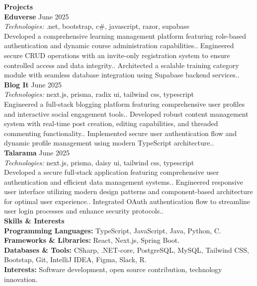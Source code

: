 \documentclass[11pt,letterpaper]{article}
\newcommand{\ressection}[1]{\vspace{0.3cm}\textbf{\large #1}\\[0.1cm]}
\begin{document}
\ressection{Projects}
\textbf{Eduverse} \hfill June 2025\\\textit{Technologies:} .net, bootstrap, c\#, javascript, razor, supabase\\Developed a comprehensive learning management platform featuring role-based authentication and dynamic course administration capabilities.. Engineered secure CRUD operations with an invite-only registration system to ensure controlled access and data integrity.. Architected a scalable training category module with seamless database integration using Supabase backend services..\\[0.3cm]\textbf{Blog It} \hfill June 2025\\\textit{Technologies:} next.js, prisma, radix ui, tailwind css, typescript\\Engineered a full-stack blogging platform featuring comprehensive user profiles and interactive social engagement tools.. Developed robust content management system with real-time post creation, editing capabilities, and threaded commenting functionality.. Implemented secure user authentication flow and dynamic profile management using modern TypeScript architecture..\\[0.3cm]\textbf{Talarama} \hfill June 2025\\\textit{Technologies:} next.js, prisma, daisy ui, tailwind css, typescript\\Developed a secure full-stack application featuring comprehensive user authentication and efficient data management systems.. Engineered responsive user interface utilizing modern design patterns and component-based architecture for optimal user experience.. Integrated OAuth authentication flow to streamline user login processes and enhance security protocols..\\[0.3cm]

\ressection{Skills \& Interests}
\textbf{Programming Languages:} TypeScript, JavaScript, Java, Python, C.\\\textbf{Frameworks \& Libraries:} React, Next.js, Spring Boot.\\\textbf{Databases \& Tools:} CSharp, .NET-core, PostgreSQL, MySQL, Tailwind CSS, Bootstap, Git, IntelliJ IDEA, Figma, Slack, R.\\\textbf{Interests:} Software development, open source contribution, technology innovation.
\end{document}
